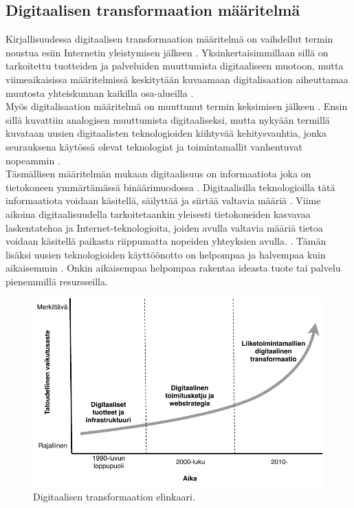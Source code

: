 \documentclass[finnish,12pt,a4paper,pdftex]{article}
\begin{document}
\subsection{Digitaalisen transformaation määritelmä}

Kirjallisuudessa digitaalisen transformaation määritelmä on vaihdellut termin noustua esiin Internetin yleistymisen jälkeen \citep{knobel}. Yksinkertaisimmillaan sillä on tarkoitettu tuotteiden ja palveluiden muuttumista digitaaliseen muotoon, mutta viimeaikaisissa määritelmissä keskitytään kuvaamaan digitalisaation aiheuttamaa muutosta yhteiskunnan kaikilla osa-alueilla \citep{lamoureux}.\\

Myös digitalisaation määritelmä on muuttunut termin keksimisen jälkeen \citep{knobel}. Ensin sillä kuvattiin analogisen muuttumista digitaaliseksi, mutta nykyään termillä kuvataan uusien digitaalisten teknologioiden kiihtyvää kehitysvauhtia, jonka seurauksena käytössä olevat teknologiat ja toimintamallit vanhentuvat nopeammin \citep{lamoureux}. \\

Täsmällisen määritelmän mukaan digitaalisuus on informaatiota joka on tietokoneen ymmärtämässä binäärimuodossa \citep{lamoureux}. Digitaalisilla teknologioilla tätä informaatiota voidaan käsitellä, säilyttää ja siirtää valtavia määriä \citep{knobel}. Viime aikoina digitaalisuudella tarkoitetaankin yleisesti tietokoneiden kasvavaa laskentatehoa ja Internet-teknologioita, joiden avulla valtavia määriä tietoa voidaan käsitellä paikasta riippumatta nopeiden yhteyksien avulla. \citep{lamoureux}. Tämän lisäksi uusien teknologioiden käyttöönotto on helpompaa ja halvempaa kuin aikaisemmin \citep{susanmoore}. Onkin aikaisempaa helpompaa rakentaa ideasta tuote tai palvelu pienemmillä resursseilla. \\

\begin{figure}[!h]
    \centering
    \includegraphics[scale=0.6]{images/digitaalinentransformaatio.pdf}
    \caption{Digitaalisen transformaation elinkaari. \citep{ibmtrans}}
    \label{fig:digivisio}
\end{figure}
\end{document}

